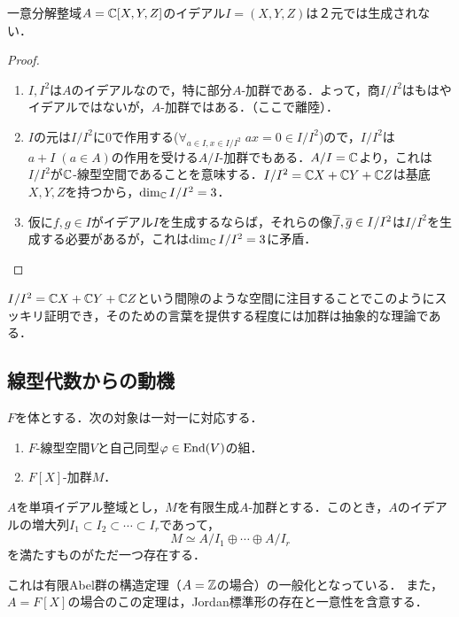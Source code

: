 \documentclass[uplatex,dvipdfmx]{jsreport}
\begin{document}
\begin{proposition}[イデアルの剰余が加群になる]
    一意分解整域$A=\mathbb{C}[X,Y,Z]$のイデアル$I=(X,Y,Z)$は２元では生成されない．
\end{proposition}
\begin{proof}\mbox{}
    \begin{enumerate}
        \item $I,I^2$は$A$のイデアルなので，特に部分$A$-加群である．よって，商$I/I^2$はもはやイデアルではないが，$A$-加群ではある．（ここで離陸）．
        \item $I$の元は$I/I^2$に$0$で作用する($\forall_{a\in I,x\in I/I^2}\;ax=0\in I/I^2$)ので，$I/I^2$は$a+I\;(a\in A)$の作用を受ける$A/I$-加群でもある．$A/I=\mathbb{C}$より，これは$I/I^2$が$\mathbb{C}$-線型空間であることを意味する．$I/I^2=\mathbb{C} X+\mathbb{C} Y+\mathbb{C} Z$は基底$X,Y,Z$を持つから，$\dim_{\mathbb{C}} I/I^2=3$．
        \item 仮に$f,g\in I$がイデアル$I$を生成するならば，それらの像$\overline{f},\overline{g}\in I/I^2$は$I/I^2$を生成する必要があるが，これは$\dim_{\mathbb{C}} I/I^2=3$に矛盾．
    \end{enumerate}
\end{proof}
\begin{remarks}
    $I/I^2=\mathbb{C} X+\mathbb{C} Y+\mathbb{C} Z$という間隙のような空間に注目することでこのようにスッキリ証明でき，そのための言葉を提供する程度には加群は抽象的な理論である．
\end{remarks}

\subsection{線型代数からの動機}

\begin{proposition}[線型空間の自己同型の問題を解決するにはその係数の多項式の加群の理論を構築すれば良い]
    $F$を体とする．次の対象は一対一に対応する．
    \begin{enumerate}
        \item $F$-線型空間$V$と自己同型$\varphi\in\mathrm{End}(V)$の組．
        \item $F[X]$-加群$M$．
    \end{enumerate}
\end{proposition}

\begin{theorem}[単項イデアル整域上の有限生成加群の構造定理]
    $A$を単項イデアル整域とし，$M$を有限生成$A$-加群とする．このとき，$A$のイデアルの増大列$I_1\subset I_2\subset\cdots\subset I_r$であって，
    \[M\simeq A/I_1\oplus\cdots\oplus A/I_r\]
    を満たすものがただ一つ存在する．
\end{theorem}
\begin{remarks}
    これは有限Abel群の構造定理（$A=\mathbb{Z}$の場合）の一般化となっている．
    また，$A=F[X]$の場合のこの定理は，Jordan標準形の存在と一意性を含意する．
\end{remarks}
\end{document}
